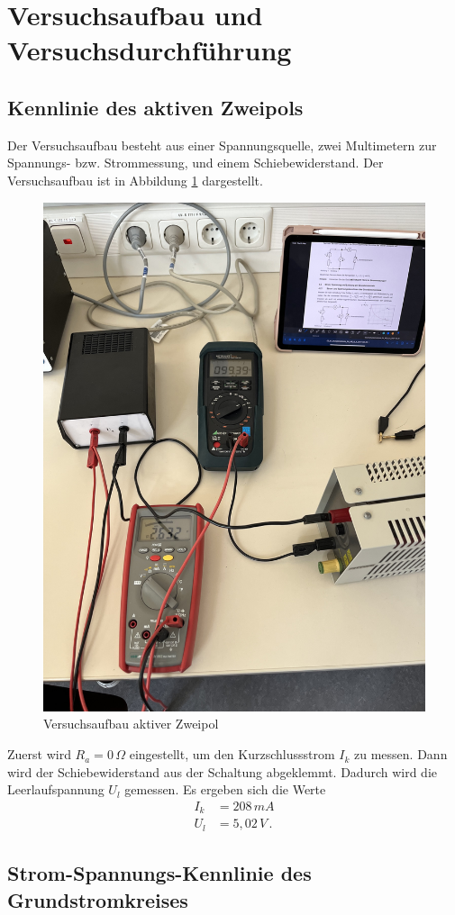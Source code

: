 \section{Versuchsaufbau und Versuchsdurchführung}

\subsection{Kennlinie des aktiven Zweipols}
Der Versuchsaufbau besteht aus einer Spannungsquelle, zwei Multimetern zur Spannungs- bzw. Strommessung, und einem Schiebewiderstand. Der Versuchsaufbau ist in Abbildung \ref{fig:versuchsaufbau} dargestellt.
\begin{figure}[ht]
    \centering
    \includegraphics[angle=-90,width=0.5\linewidth]{Bilder/Versuchsaufbau.jpg}
    \caption{Versuchsaufbau aktiver Zweipol}
    \label{fig:versuchsaufbau}
\end{figure}

Zuerst wird $R_a=0\,\Omega$ eingestellt, um den Kurzschlussstrom $I_k$ zu messen. Dann wird der Schiebewiderstand aus der Schaltung abgeklemmt. Dadurch wird die Leerlaufspannung $U_l$ gemessen.
Es ergeben sich die Werte
\begin{align*}
    I_k & = 208\,mA     \\
    U_l & = 5,02\,V\, .
\end{align*}

\subsection{Strom-Spannungs-Kennlinie des Grundstromkreises}

